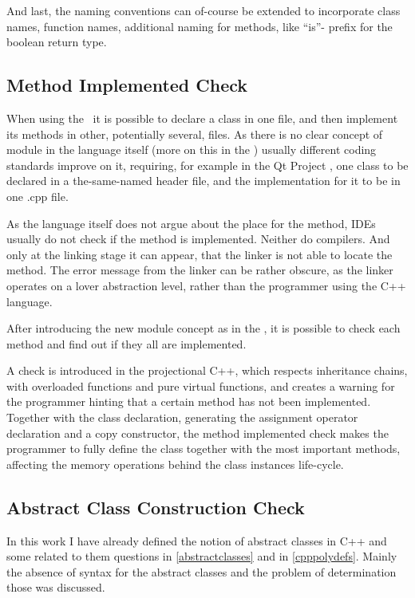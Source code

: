 And last, the naming conventions can of-course be extended to incorporate class names, function names, additional naming for methods,
like ``is''- prefix for the boolean return type. 


\subsection{Method Implemented Check}

When using the \cpppl\ it is possible to declare a class in one file, and then implement its methods in other, potentially
several, files. As there is no clear concept of module in the language itself (more on this in the ) usually 
different coding standards improve on it, requiring, for example in the Qt Project \cite{qtcodingguide}, one class to be 
declared in a the-same-named header file, and the implementation for it to be in one .cpp file.

As the language itself does not argue about the place for the method, IDEs usually do not check if the method is implemented.
Neither do compilers. And only at the linking stage it can appear, that the linker is not able to locate the method. The error
message from the linker can be rather obscure, as the linker operates on a lover abstraction level, rather than the programmer 
using the C++ language. 

After introducing the new module concept as in the , it is possible to check each method and find out if they all 
are implemented. 

A check is introduced in the projectional C++, which respects inheritance chains, with overloaded functions and pure virtual functions,
and creates a warning for the programmer hinting that a certain method has not been implemented. Together with the class declaration, 
generating the assignment operator declaration and a copy constructor, the method implemented check makes the programmer to 
fully define the class together with the most important methods, affecting the memory operations behind the class instances life-cycle.


\subsection{Abstract Class Construction Check}

In this work I have already defined the notion of abstract classes in C++ and some related to them questions in \ref{abstractclasses} and
in \ref{cpppolydefs}. Mainly the absence of syntax for the abstract classes and the problem of determination those was discussed.


